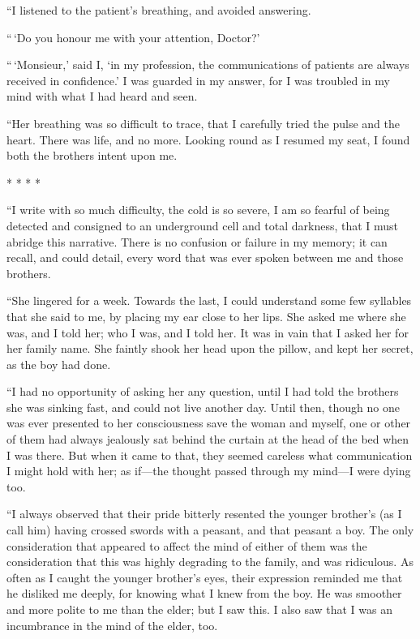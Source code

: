 ``I listened to the patient's breathing, and avoided answering.

``\,`Do you honour me with your attention, Doctor?'

``\,`Monsieur,' said I, `in my profession, the communications of
patients are always received in confidence.' I was guarded in my
answer, for I was troubled in my mind with what I had heard and seen.

``Her breathing was so difficult to trace, that I carefully tried the
pulse and the heart.  There was life, and no more.  Looking round as
I resumed my seat, I found both the brothers intent upon me.

* * * *

``I write with so much difficulty, the cold is so severe, I am so
fearful of being detected and consigned to an underground cell and
total darkness, that I must abridge this narrative.  There is no
confusion or failure in my memory; it can recall, and could detail,
every word that was ever spoken between me and those brothers.

``She lingered for a week.  Towards the last, I could understand some
few syllables that she said to me, by placing my ear close to her lips.
She asked me where she was, and I told her; who I was, and I told her.
It was in vain that I asked her for her family name.  She faintly
shook her head upon the pillow, and kept her secret, as the boy had done.

``I had no opportunity of asking her any question, until I had told
the brothers she was sinking fast, and could not live another day.
Until then, though no one was ever presented to her consciousness
save the woman and myself, one or other of them had always jealously
sat behind the curtain at the head of the bed when I was there.
But when it came to that, they seemed careless what communication I
might hold with her; as if---the thought passed through my mind---I
were dying too.

``I always observed that their pride bitterly resented the younger
brother's (as I call him) having crossed swords with a peasant, and
that peasant a boy.  The only consideration that appeared to affect
the mind of either of them was the consideration that this was highly
degrading to the family, and was ridiculous.  As often as I caught
the younger brother's eyes, their expression reminded me that he
disliked me deeply, for knowing what I knew from the boy.  He was
smoother and more polite to me than the elder; but I saw this.
I also saw that I was an incumbrance in the mind of the elder, too.

